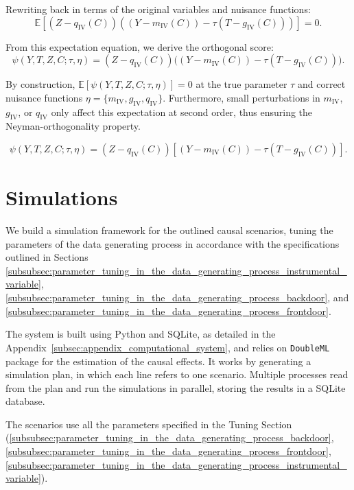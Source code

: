 \documentclass{article}
\numberwithin{equation}{section}
\begin{document}
Rewriting back in terms of the original variables and nuisance functions:
\[
\mathbb{E}[(Z - q_{\text{IV}}(C))((Y - m_{\text{IV}}(C)) - \tau (T - g_{\text{IV}}(C)))] = 0.
\]

From this expectation equation, we derive the orthogonal score:
\[
\psi(Y, T, Z, C; \tau, \eta) 
= (Z - q_{\text{IV}}(C))\bigl((Y - m_{\text{IV}}(C)) - \tau (T - g_{\text{IV}}(C))\bigr).
\]

By construction, \(\mathbb{E}[\psi(Y, T, Z, C; \tau, \eta)] = 0\) at the true parameter \(\tau\) and correct nuisance functions \(\eta = \{m_{\text{IV}}, g_{\text{IV}}, q_{\text{IV}}\}\). Furthermore, small perturbations in \(m_{\text{IV}}\), \(g_{\text{IV}}\), or \(q_{\text{IV}}\) only affect this expectation at second order, thus ensuring the Neyman-orthogonality property.

\begin{equation}
\psi(Y, T, Z, C; \tau, \eta) 
= (Z - q_{\text{IV}}(C)) \left[ (Y - m_{\text{IV}}(C)) - \tau (T - g_{\text{IV}}(C)) \right].
\end{equation}

\section{Simulations}

We build a simulation framework for the outlined causal scenarios, tuning the parameters of the data generating process in accordance with the specifications outlined in Sections \ref{subsubsec:parameter_tuning_in_the_data_generating_process_instrumental_variable}, \ref{subsubsec:parameter_tuning_in_the_data_generating_process_backdoor}, and \ref{subsubsec:parameter_tuning_in_the_data_generating_process_frontdoor}.

The system is built using Python and SQLite, as detailed in the Appendix~\ref{subsec:appendix_computational_system}, and relies on \texttt{DoubleML} package for the estimation of the causal effects. It works by generating a simulation plan, in which each line refers to one scenario. Multiple processes read from the plan and run the simulations in parallel, storing the results in a SQLite database.

The scenarios use all the parameters specified in the Tuning Section (\ref{subsubsec:parameter_tuning_in_the_data_generating_process_backdoor}, \ref{subsubsec:parameter_tuning_in_the_data_generating_process_frontdoor}, \ref{subsubsec:parameter_tuning_in_the_data_generating_process_instrumental_variable}).
\end{document}
